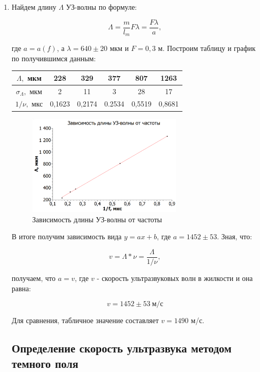 \documentclass[a4paper, 12pt]{article}%
\begin{document}
\begin{enumerate}
\item Найдем длину $\Lambda$ УЗ-волны по формуле:

\[\Lambda = \frac{m}{l_m}F\lambda = \frac{F \lambda}{a},\]

где $a = a(f)$, а $\lambda = 640 \pm 20$ мкм и $F = 0,3$ м. Построим таблицу и график по получившимся данным:

\begin{center}
\begin{tabular}{|c|c|c|c|c|c|}
\hline 
$\Lambda,$ мкм & 228 & 329 & 377 & 807 & 1263 \\ 
\hline
$\sigma_{\Lambda},$ мкм & 2 & 11 & 3 & 28 & 17 \\ 
\hline 
$1/ \nu ,$ мкс & 0,1623 & 0,2174 & 0.2534 & 0,5519 & 0,8681 \\ 
\hline 
\end{tabular} 
\end{center}

\begin{figure}[h!]
    \centering	
    \includegraphics[width=0.7\textwidth]{images/graph_2.png}
    \caption{Зависимость длины УЗ-волны от частоты}
    \label{graph_2}
\end{figure}

В итоге получим зависимость вида $y = ax+b$, где $a = 1452 \pm 53$. Зная, что:

\[v = \Lambda * \nu = \frac{\Lambda}{1/\nu},\]

получаем, что $a= v$, где $v$ - скорость ультразвуковых волн в жилкости и она равна:

\[v = 1452 \pm 53 \: \text{м/с}\]

Для сравнения, табличное значение составляет $v = 1490$ м/с.

\subsection*{Определение скорость ультразвука методом темного поля}


\end{enumerate}
\end{document}
